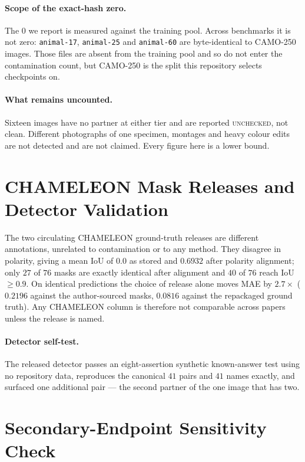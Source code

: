 \documentclass{article} %
\begin{document}
\paragraph{Scope of the exact-hash zero.} The $0$ we report is measured against the training pool.
Across benchmarks it is not zero: \texttt{animal-17}, \texttt{animal-25} and \texttt{animal-60} are
byte-identical to CAMO-250 images. Those files are absent from the training pool and so do not enter
the contamination count, but CAMO-250 is the split this repository selects checkpoints on.

\paragraph{What remains uncounted.} Sixteen images have no partner at either tier and are reported
\textsc{unchecked}, not clean. Different photographs of one specimen, montages and heavy colour edits
are not detected and are not claimed. Every figure here is a lower bound.


\section{CHAMELEON Mask Releases and Detector Validation}
\label{app:masks}

The two circulating CHAMELEON ground-truth releases are different annotations, unrelated to
contamination or to any method. They disagree in polarity, giving a mean IoU of $0.0$ as stored and
$0.6932$ after polarity alignment; only $27$ of $76$ masks are exactly identical after alignment and
$40$ of $76$ reach IoU $\geq 0.9$. On identical predictions the choice of release alone moves MAE by
$2.7\times$ ($0.2196$ against the author-sourced masks, $0.0816$ against the repackaged ground truth).
Any CHAMELEON column is therefore not comparable across papers unless the release is named.

\paragraph{Detector self-test.} The released detector passes an eight-assertion synthetic
known-answer test using no repository data, reproduces the canonical $41$ pairs and $41$ names
exactly, and surfaced one additional pair --- the second partner of the one image that has two.


\section{Secondary-Endpoint Sensitivity Check}
\end{document}
